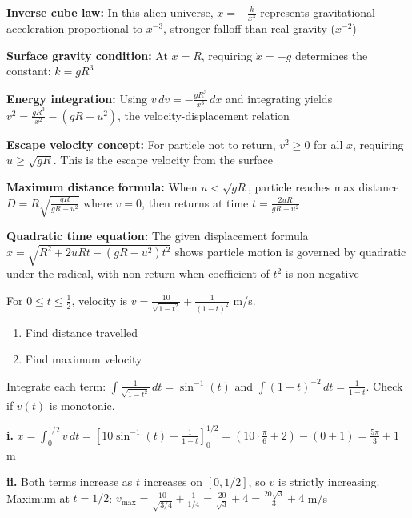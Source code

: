 \begin{takeaways}
\item \textbf{Inverse cube law:} In this alien universe, $\ddot{x} = -\frac{k}{x^3}$ represents gravitational acceleration proportional to $x^{-3}$, stronger falloff than real gravity ($x^{-2}$)
\item \textbf{Surface gravity condition:} At $x = R$, requiring $\ddot{x} = -g$ determines the constant: $k = gR^3$
\item \textbf{Energy integration:} Using $v\,dv = -\frac{gR^3}{x^3}\,dx$ and integrating yields $v^2 = \frac{gR^3}{x^2} - (gR-u^2)$, the velocity-displacement relation
\item \textbf{Escape velocity concept:} For particle not to return, $v^2 \ge 0$ for all $x$, requiring $u \ge \sqrt{gR}$. This is the escape velocity from the surface
\item \textbf{Maximum distance formula:} When $u < \sqrt{gR}$, particle reaches max distance $D = R\sqrt{\frac{gR}{gR-u^2}}$ where $v=0$, then returns at time $t = \frac{2uR}{gR-u^2}$
\item \textbf{Quadratic time equation:} The given displacement formula $x = \sqrt{R^2 + 2uRt - (gR-u^2)t^2}$ shows particle motion is governed by quadratic under the radical, with non-return when coefficient of $t^2$ is non-negative
\end{takeaways}

\begin{problem}
For $0 \le t \le \frac{1}{2}$, velocity is $v = \frac{10}{\sqrt{1-t^2}} + \frac{1}{(1-t)^2}$ m/s.
\begin{enumerate}[label=\textbf{\roman*.}]
    \item Find distance travelled
    \item Find maximum velocity
\end{enumerate}
\end{problem}

\begin{hint}
Integrate each term: $\int \frac{1}{\sqrt{1-t^2}}\,dt = \sin^{-1}(t)$ and $\int (1-t)^{-2}\,dt = \frac{1}{1-t}$. Check if $v(t)$ is monotonic.
\end{hint}

\begin{solution}
\textbf{i.} $x = \int_0^{1/2} v\,dt = [10\sin^{-1}(t) + \frac{1}{1-t}]_0^{1/2} = (10 \cdot \frac{\pi}{6} + 2) - (0 + 1) = \frac{5\pi}{3} + 1$ m

\textbf{ii.} Both terms increase as $t$ increases on $[0, 1/2]$, so $v$ is strictly increasing. Maximum at $t = 1/2$: $v_{\max} = \frac{10}{\sqrt{3/4}} + \frac{1}{1/4} = \frac{20}{\sqrt{3}} + 4 = \frac{20\sqrt{3}}{3} + 4$ m/s
\end{solution}

